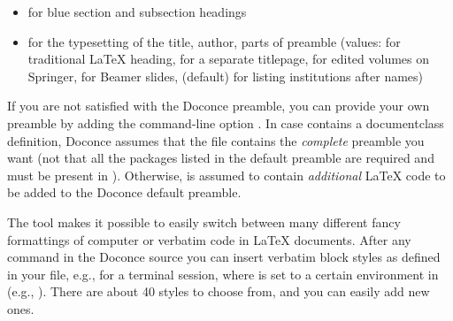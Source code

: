 \documentclass[%
oneside,                 %
final,                   %
10pt]{article}
\begin{document}
\begin{itemize}
 \item {} for blue section and subsection headings

 \item {} for the typesetting of the title, author, parts of
   preamble (values:  for traditional {\LaTeX} heading,
    for a separate titlepage,  for
   edited volumes on Springer,  for Beamer slides, 
   (default) for listing institutions after names)
\end{itemize}

\noindent
If you are not satisfied with the Doconce preamble, you can provide
your own preamble by adding the command-line option .
In case  contains a documentclass definition, Doconce assumes
that the file contains the \emph{complete} preamble you want (not that all
the packages listed in the default preamble are required and must be
present in ). Otherwise,  is assumed to contain
\emph{additional} {\LaTeX} code to be added to the Doconce default preamble.

The  tool makes it possible to easily switch between many
different fancy formattings of computer or verbatim code in {\LaTeX}
documents. After any  command in the Doconce source you can
insert verbatim block styles as defined in your 
file, e.g.,  for a terminal session, where  is set to
a certain environment in  (e.g., ).
There are about 40 styles to choose from, and you can easily add
new ones.
\end{document}

